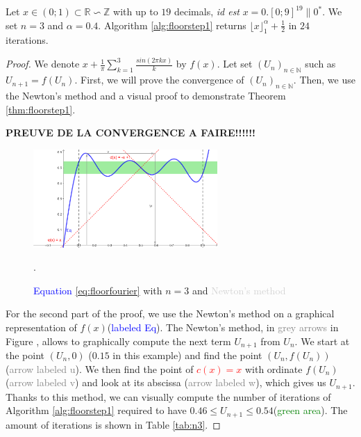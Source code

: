 \documentclass[runningheads]{llncs}
\begin{document}
\begin{theorem}\label{thm:floorstep1}
  Let $x\in(0;1)\subset\mathbb{R}\backsim \mathbb{Z}$ with up to $19$ decimals, \emph{id est} $x= 0.[0;9]^{19}\|{0}^*$. We set $n=3$ and $\alpha=0.4$. Algorithm \ref{alg:floorstep1} returns $\lfloor x \rfloor_1^\alpha+\frac{1}{2}$ in $24$ iterations.
\end{theorem}
\begin{proof}
  We denote $x + \frac{1}{\pi}\sum_{k=1}^{3}\frac{sin(2\pi k x)}{k}$ by $f(x)$. Let set $(U_n)_{n\in\mathbb{N}}$ such as $U_{n+1} = f(U_n)$. First, we will prove the convergence of $(U_n)_{n\in\mathbb{N}}$. Then, we use the Newton's method and a visual proof to demonstrate Theorem \ref{thm:floorstep1}.

  \medskip

  \noindent \textbf{PREUVE DE LA CONVERGENCE A FAIRE!!!!!!}

  \begin{figure}[!ht]
    \centering
    \includegraphics[width =7cm]{figure/eqn7NewtonSmaller.png}
    \caption{\textcolor{blue}{Equation} \ref{eq:floorfourier} with $n=3$ and \textcolor{lightgray}{Newton's method}}.
    \label{fig:newton3}
  \end{figure}

  For the second part of the proof, we use the Newton's method on a graphical representation of $f(x)$(\textcolor{blue}{labeled Eq}). The Newton's  method, in \textcolor{gray}{grey arrows} in Figure , allows to graphically compute the next term $U_{n+1}$ from $U_n$. We start at the point $(U_n,0)$ ($\num{0.15}$ in this example) and find the point $(U_n,f(U_n))$ (\textcolor{gray}{arrow labeled u}). We then find the point of \textcolor{red}{$c(x)=x$} with ordinate $f(U_n)$ (\textcolor{gray}{arrow labeled v}) and look at its abscissa (\textcolor{gray}{arrow labeled w}), which gives us $U_{n+1}$. Thanks to this method, we can visually compute the number of iterations of Algorithm \ref{alg:floorstep1} required to have $\num{0.46}\leq U_{n+1}\leq \num{0.54}$(\textcolor{green}{green area}). The amount of iterations is shown in Table \ref{tab:n3}.


\end{proof}
\end{document}
